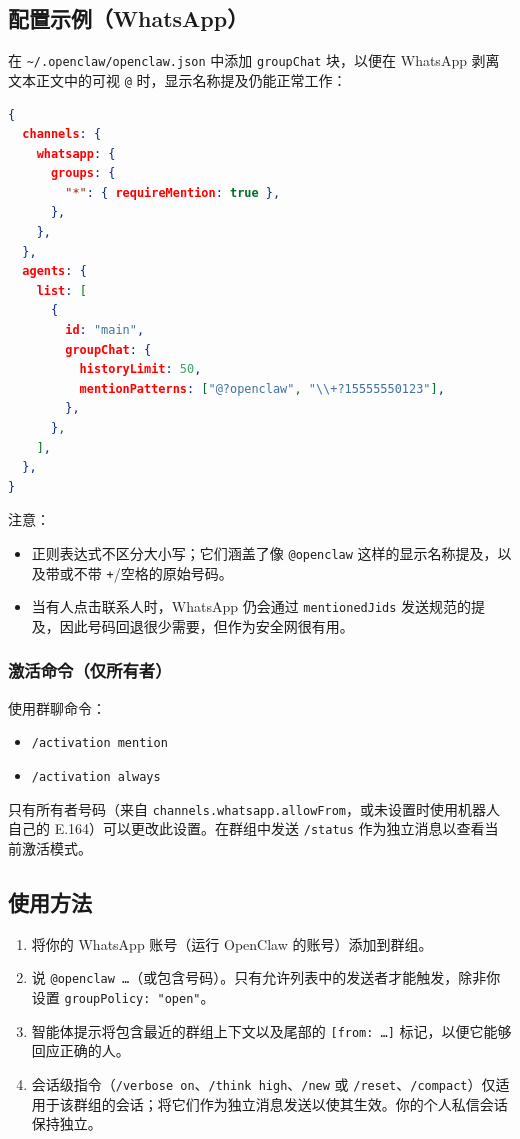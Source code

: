\subsection{配置示例（WhatsApp）}


在 \texttt{\textasciitilde{}/.openclaw/openclaw.json} 中添加 \texttt{groupChat} 块，以便在 WhatsApp 剥离文本正文中的可视 \texttt{@} 时，显示名称提及仍能正常工作：

\begin{lstlisting}[language=json]
{
  channels: {
    whatsapp: {
      groups: {
        "*": { requireMention: true },
      },
    },
  },
  agents: {
    list: [
      {
        id: "main",
        groupChat: {
          historyLimit: 50,
          mentionPatterns: ["@?openclaw", "\\+?15555550123"],
        },
      },
    ],
  },
}
\end{lstlisting}


注意：

\begin{itemize}
  \item 正则表达式不区分大小写；它们涵盖了像 \texttt{@openclaw} 这样的显示名称提及，以及带或不带 \texttt{+}/空格的原始号码。
  \item 当有人点击联系人时，WhatsApp 仍会通过 \texttt{mentionedJids} 发送规范的提及，因此号码回退很少需要，但作为安全网很有用。
\end{itemize}


\subsubsection{激活命令（仅所有者）}


使用群聊命令：

\begin{itemize}
  \item \texttt{/activation mention}
  \item \texttt{/activation always}
\end{itemize}


只有所有者号码（来自 \texttt{channels.whatsapp.allowFrom}，或未设置时使用机器人自己的 E.164）可以更改此设置。在群组中发送 \texttt{/status} 作为独立消息以查看当前激活模式。

\subsection{使用方法}


\begin{enumerate}
  \item 将你的 WhatsApp 账号（运行 OpenClaw 的账号）添加到群组。
  \item 说 \texttt{@openclaw …}（或包含号码）。只有允许列表中的发送者才能触发，除非你设置 \texttt{groupPolicy: "open"}。
  \item 智能体提示将包含最近的群组上下文以及尾部的 \texttt{[from: …]} 标记，以便它能够回应正确的人。
  \item 会话级指令（\texttt{/verbose on}、\texttt{/think high}、\texttt{/new} 或 \texttt{/reset}、\texttt{/compact}）仅适用于该群组的会话；将它们作为独立消息发送以使其生效。你的个人私信会话保持独立。
\end{enumerate}


